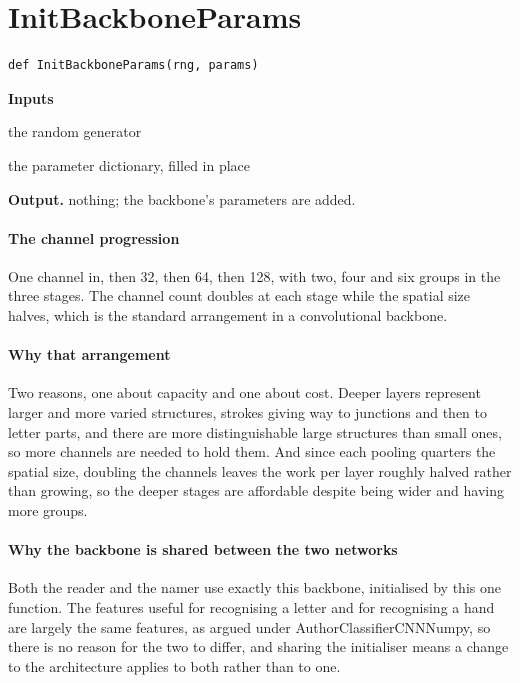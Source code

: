 \section{InitBackboneParams}
\begin{lstlisting}[style=sig]
def InitBackboneParams(rng, params)
\end{lstlisting}

\noindent\textbf{Inputs}
\begin{description}[leftmargin=2.2em,style=nextline,font=\normalfont\ttfamily]\setlength\itemsep{1pt}
  \item[{rng}] \normalfont the random generator
  \item[{params}] \normalfont the parameter dictionary, filled in place
\end{description}

\noindent\textbf{Output.} nothing; the backbone's parameters are added.


\paragraph{The channel progression}
One channel in, then 32, then 64, then 128, with two, four and six groups in the three stages. The channel count doubles at each stage while the spatial size halves, which is the standard arrangement in a convolutional backbone.


\paragraph{Why that arrangement}
Two reasons, one about capacity and one about cost. Deeper layers represent larger and more varied structures, strokes giving way to junctions and then to letter parts, and there are more distinguishable large structures than small ones, so more channels are needed to hold them. And since each pooling quarters the spatial size, doubling the channels leaves the work per layer roughly halved rather than growing, so the deeper stages are affordable despite being wider and having more groups.


\paragraph{Why the backbone is shared between the two networks}
Both the reader and the namer use exactly this backbone, initialised by this one function. The features useful for recognising a letter and for recognising a hand are largely the same features, as argued under AuthorClassifierCNNNumpy, so there is no reason for the two to differ, and sharing the initialiser means a change to the architecture applies to both rather than to one.



